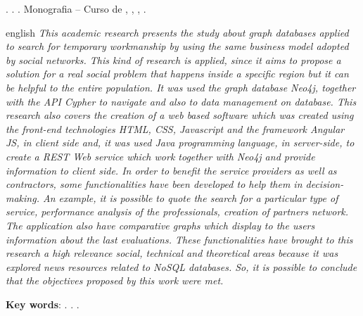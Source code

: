 
\begin{OnehalfSpacing} 

\noindent \imprimirAutorCitacaoMaiuscula. {\bfseries\imprimirtitulo}. {\imprimirdata}.  Monografia -- Curso de {\MakeUppercase\imprimircurso}, {\imprimirinstituicao}, {\imprimirlocal}, {\imprimirdata}.

\vspace{\onelineskip}
\vspace{\onelineskip}
\vspace{\onelineskip}
\vspace{\onelineskip}

\begin{resumo}[Abstract]%
\begin{otherlanguage*}{english}%
\textit{
\noindent This academic research presents the study about graph databases applied to search for temporary workmanship by using the same business model adopted by social networks. This kind of research is applied, since it aims to propose a solution for a real social problem that happens inside a specific region but it can be helpful to the entire population. It was used the graph database Neo4j, together with the API Cypher to navigate and also to data management on database. This research also covers the creation of a web based software which was created using the front-end technologies HTML, CSS, Javascript and the framework Angular JS, in client side and, it was used Java programming language, in  server-side, to create a REST Web service which work together with Neo4j and provide information to client side. In order to benefit the service providers as well as contractors, some functionalities have been developed to help them in decision-making. An example, it is possible to quote the search for a particular type of service, performance analysis of the professionals, creation of partners network. The application also have comparative graphs which display to the users information about the last evaluations. These functionalities have brought to this research a high relevance social, technical and theoretical areas because it was explored news resources related to NoSQL databases. So, it is possible to conclude that the objectives proposed by this work were met.
}

\vspace{\onelineskip}
\vspace*{\fill}
\noindent \textbf{Key words}: \imprimirKeyWordOne. \imprimirKeyWordTwo. \imprimirKeyWordThree.
\end{otherlanguage*}
\vspace{\onelineskip}
\end{resumo}

\end{OnehalfSpacing}
